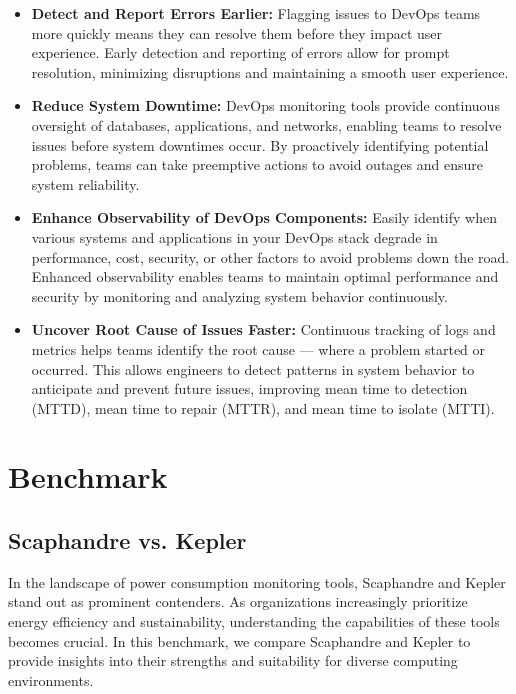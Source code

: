\begin{itemize}
  \item \textbf{Detect and Report Errors Earlier:}
  Flagging issues to DevOps teams more quickly means they can resolve them before they impact user experience. Early detection and reporting of errors allow for prompt resolution, minimizing disruptions and maintaining a smooth user experience.
  \item \textbf{Reduce System Downtime:}
  DevOps monitoring tools provide continuous oversight of databases, applications, and networks, enabling teams to resolve issues before system downtimes occur. By proactively identifying potential problems, teams can take preemptive actions to avoid outages and ensure system reliability.
  \item \textbf{Enhance Observability of DevOps Components:}
  Easily identify when various systems and applications in your DevOps stack degrade in performance, cost, security, or other factors to avoid problems down the road. Enhanced observability enables teams to maintain optimal performance and security by monitoring and analyzing system behavior continuously.

  \item \textbf{Uncover Root Cause of Issues Faster:}
  Continuous tracking of logs and metrics helps teams identify the root cause — where a problem started or occurred. This allows engineers to detect patterns in system behavior to anticipate and prevent future issues, improving mean time to detection (MTTD), mean time to repair (MTTR), and mean time to isolate (MTTI).
\end{itemize}



\section{Benchmark}

\subsection{Scaphandre vs. Kepler}

In the landscape of power consumption monitoring tools, Scaphandre and Kepler stand out as prominent contenders. As organizations increasingly prioritize energy efficiency and sustainability, understanding the capabilities of these tools becomes crucial. In this benchmark, we compare Scaphandre and Kepler to provide insights into their strengths and suitability for diverse computing environments.

